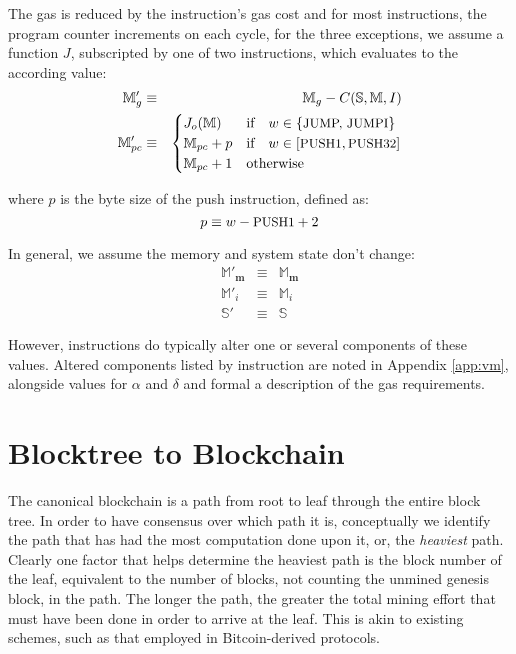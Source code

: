 \documentclass[9pt,oneside]{amsart}
\begin{document}
\begin{multicols}{2}
The gas is reduced by the instruction's gas cost and for most instructions, the program counter increments on each cycle, for the three exceptions, we assume a function $J$, subscripted by one of two instructions, which evaluates to the according value:
\begin{eqnarray}
\mathbb{M}'_{g} & \equiv & \mathbb{M}_{g} - C(\mathbb{S}, \mathbb{M}, I) \\
\mathbb{M}'_{pc} & \equiv & \begin{cases}
J_o(\mathbb{M}) & \text{if} \quad w \in \{ \text{\small JUMP, JUMPI} \} \\
\mathbb{M}_{pc} + p & \text{if} \quad w \in [\text{\small PUSH1}, \text{\small PUSH32}] \\
\mathbb{M}_{pc} + 1 & \text{otherwise}
\end{cases}
\end{eqnarray}

where $p$ is the byte size of the push instruction, defined as:
\begin{equation}
p \equiv w - \text{\small PUSH1} + 2
\end{equation}

In general, we assume the memory and system state don't change:
\begin{eqnarray}
\mathbb{M}'_\mathbf{m} & \equiv & \mathbb{M}_\mathbf{m} \\
\mathbb{M}'_i & \equiv & \mathbb{M}_i \\
\mathbb{S}' & \equiv & \mathbb{S}
\end{eqnarray}

However, instructions do typically alter one or several components of these values. Altered components listed by instruction are noted in Appendix \ref{app:vm}, alongside values for $\alpha$ and $\delta$ and formal a description of the gas requirements.

\section{Blocktree to Blockchain} \label{ch:ghost}

The canonical blockchain is a path from root to leaf through the entire block tree. In order to have consensus over which path it is, conceptually we identify the path that has had the most computation done upon it, or, the \textit{heaviest} path. Clearly one factor that helps determine the heaviest path is the block number of the leaf, equivalent to the number of blocks, not counting the unmined genesis block, in the path. The longer the path, the greater the total mining effort that must have been done in order to arrive at the leaf. This is akin to existing schemes, such as that employed in Bitcoin-derived protocols.


\end{multicols}
\end{document}
